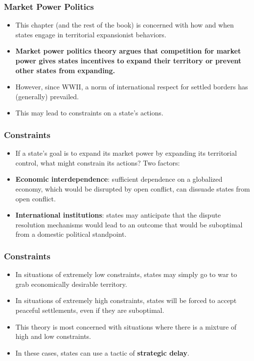 \documentclass{beamer}
\begin{document}
\begin{frame} 
	\frametitle{\LARGE{Market Power Politics}}
	\begin{itemize}
		\item This chapter (and the rest of the book) is concerned with how and when states engage in territorial expansionist behaviors. \pause
		\item \textbf{Market power politics theory argues that competition for market power gives states incentives to expand their territory or prevent other states from expanding.}
		\item However, since WWII, a norm of international respect for settled borders has (generally) prevailed. \pause
		\item This may lead to constraints on a state's actions. 
	\end{itemize}
\end{frame}

\begin{frame} 
	\frametitle{\LARGE{Constraints}}
	\begin{itemize}
		\item If a state's goal is to expand its market power by expanding its territorial control, what might constrain its actions? Two factors: \pause
		\item \textbf{Economic interdependence}: sufficient dependence on a globalized economy, which would be disrupted by open conflict, can dissuade states from open conflict. \pause
		\item \textbf{International institutions}: states may anticipate that the dispute resolution mechanisms would lead to an outcome that would be suboptimal from a domestic political standpoint.
	\end{itemize}
\end{frame}	

\begin{frame} 
	\frametitle{\LARGE{Constraints}}
	\begin{itemize}
		\item In situations of extremely low constraints, states may simply go to war to grab economically desirable territory. \pause
		\item In situations of extremely high constraints, states will be forced to accept peaceful settlements, even if they are suboptimal. \pause
		\item This theory is most concerned with situations where there is a mixture of high and low constraints. \pause 
		\item In these cases, states can use a tactic of \textbf{strategic delay}.
	\end{itemize}
\end{frame}	
\end{document}
